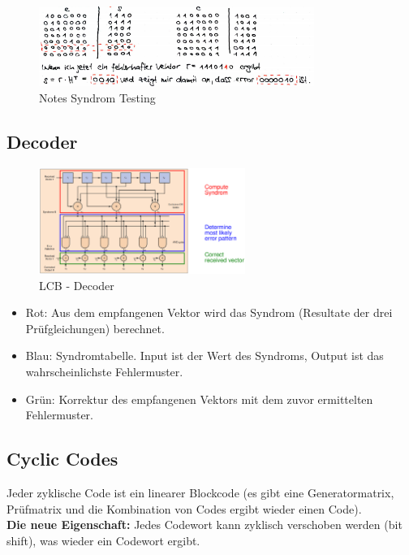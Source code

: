 \begin{figure}[H]
\centering
\includegraphics[width=0.8\textwidth]{figures/syndromTestingNotes.png}
\caption{Notes Syndrom Testing}
\end{figure}

\subsection{Decoder}
\begin{figure}[H]
\centering
\includegraphics[width=0.6\textwidth]{figures/lbc_decoder.png}
\caption{LCB - Decoder}
\end{figure}

\begin{itemize}
    \item Rot: Aus dem empfangenen Vektor wird das Syndrom (Resultate der drei Prüfgleichungen) berechnet.
    \item Blau: Syndromtabelle. Input ist der Wert des Syndroms, Output ist das wahrscheinlichste Fehlermuster.
    \item Grün: Korrektur des empfangenen Vektors mit dem zuvor ermittelten Fehlermuster.
\end{itemize}

\subsection{Cyclic Codes}
 Jeder zyklische Code ist ein linearer Blockcode (es gibt eine Generatormatrix, Prüfmatrix und die Kombination von Codes ergibt wieder einen Code).\\

\textbf{Die neue Eigenschaft:}
Jedes Codewort kann zyklisch verschoben werden (bit shift), was wieder ein Codewort ergibt.\\

